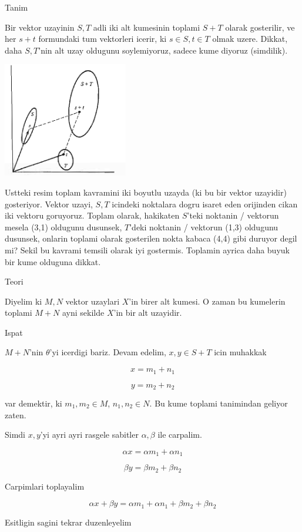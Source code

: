 \documentclass[12pt,fleqn]{article}
\begin{document}
Tanim

Bir vektor uzayinin $S,T$ adli iki alt kumesinin toplami $S+T$ olarak
gosterilir, ve her $s+t$ formundaki tum vektorleri icerir, ki $s \in S,t
\in T$ 
olmak uzere. Dikkat, daha $S,T$'nin alt uzay oldugunu soylemiyoruz, sadece
kume diyoruz (simdilik). 

\includegraphics[height=5cm]{3_1.png}

Ustteki resim toplam kavramini iki boyutlu uzayda (ki bu bir vektor
uzayidir) gosteriyor. Vektor uzayi, $S,T$ icindeki noktalara dogru isaret
eden orijinden cikan iki vektoru goruyoruz. Toplam olarak, hakikaten
$S$'teki noktanin / vektorun mesela (3,1) oldugunu dusunsek, $T$'deki
noktanin / vektorun (1,3) oldugunu dusunsek, onlarin toplami olarak
gosterilen nokta kabaca (4,4) gibi duruyor degil mi? Sekil bu kavrami
temsili olarak iyi gostermis. Toplamin ayrica daha buyuk bir kume olduguna
dikkat. 

Teori 

Diyelim ki $M,N$ vektor uzaylari $X$'in birer alt kumesi. O zaman bu kumelerin
toplami $M + N$ ayni sekilde $X$'in bir alt uzayidir. 

Ispat 

$M+N$'nin $\theta$'yi icerdigi bariz. Devam edelim, $x,y \in S+T$ icin
muhakkak 

\[ x = m_1 + n_1 \]

\[ y = m_2 + n_2 \]

var demektir, ki $m_1,m_2 \in M$, $n_1,n_2 \in N$. Bu kume toplami
tanimindan geliyor zaten. 

Simdi $x,y$'yi ayri ayri rasgele sabitler $\alpha,\beta$ ile carpalim. 

\[ \alpha x = \alpha m_1 + \alpha n_1 \]

\[ \beta y = \beta m_2 + \beta n_2 \]

Carpimlari toplayalim

\[ \alpha x + \beta y  = \alpha m_1 + \alpha n_1 + \beta m_2 + \beta n_2 \]

Esitligin sagini tekrar duzenleyelim
\end{document}
